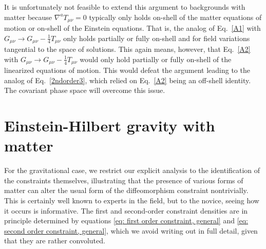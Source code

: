 \documentclass[]{jkpaper}
\theoremstyle{plain}
\theoremstyle{definition}
\begin{document}
It is unfortunately not feasible to extend this argument to backgrounds with matter because $\nabla^a T_{\mu \nu}=0$ typically only holds on-shell of the matter equations of motion or on-shell of the Einstein equations. That is, the analog of Eq.~\eqref{A1} with $G_{\mu \nu}\to G_{\mu \nu}-\frac{1}{4}T_{\mu \nu}$ only holds partially or fully on-shell and for field variations tangential to the space of solutions. This again means, however, that Eq.~\eqref{A2} with $G_{\mu \nu}\to G_{\mu \nu}-\frac{1}{4}T_{\mu \nu}$ would only hold partially or fully on-shell of the linearized equations of motion. This would defeat the argument leading to the analog of Eq.~\eqref{2ndorder3}, which relied on Eq.~\eqref{A2} being an off-shell identity. The covariant phase space will overcome this issue.




\section{Einstein-Hilbert gravity with matter} \label{sect: EH with matter}
For the gravitational case, we restrict our explicit analysis to the identification of the constraints themselves, illustrating that the presence of various forms of matter can alter the usual form of the diffeomorphism constraint nontrivially.  This is certainly well known to experts in the field, but to the novice, seeing how it occurs is informative.  The first and second-order constraint densities are in principle determined by equations \eqref{eq: first order constraint, general} and \eqref{eq: second order constraint, general}, which we avoid writing out in full detail, given that they are rather convoluted.
\end{document}
